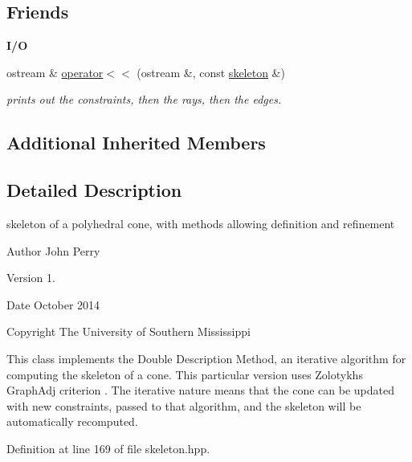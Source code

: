 \subsection*{Friends}
\begin{Indent}\textbf{ I/O}\par
\begin{DoxyCompactItemize}
\item 
\mbox{\label{classskeleton_a5732209c39488881acfc0fb5831e513b}} 
ostream \& \hyperlink{classskeleton_a5732209c39488881acfc0fb5831e513b}{operator$<$$<$} (ostream \&, const \hyperlink{classskeleton}{skeleton} \&)
\begin{DoxyCompactList}\small\item\em prints out the constraints, then the rays, then the edges. \end{DoxyCompactList}\end{DoxyCompactItemize}
\end{Indent}
\subsection*{Additional Inherited Members}


\subsection{Detailed Description}
skeleton of a polyhedral cone, with methods allowing definition and refinement 

\begin{DoxyAuthor}{Author}
John Perry 
\end{DoxyAuthor}
\begin{DoxyVersion}{Version}
1. 
\end{DoxyVersion}
\begin{DoxyDate}{Date}
October 2014 
\end{DoxyDate}
\begin{DoxyCopyright}{Copyright}
The University of Southern Mississippi
\end{DoxyCopyright}
This class implements the Double Description Method, an iterative algorithm for computing the skeleton of a cone. This particular version uses Zolotykh\textquotesingle{}s Graph\+Adj criterion \cite{Zolotych_DoubleDescription}. The iterative nature means that the cone can be updated with new constraints, passed to that algorithm, and the skeleton will be automatically recomputed. 

Definition at line 169 of file skeleton.\+hpp.



